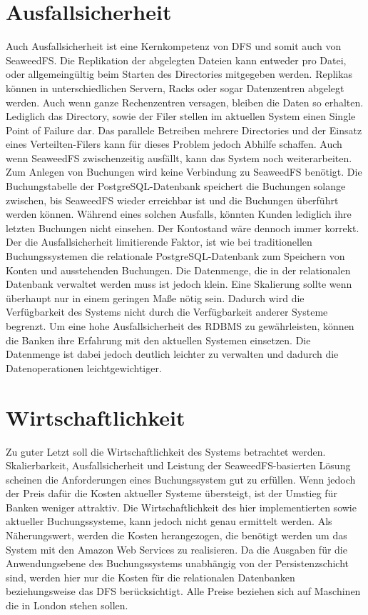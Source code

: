 \documentclass[12pt,oneside,a4paper,parskip]{scrbook}
\begin{document}
\section{Ausfallsicherheit}
Auch Ausfallsicherheit ist eine Kernkompetenz von DFS und somit auch von SeaweedFS. Die Replikation der abgelegten Dateien kann entweder pro Datei, oder allgemeingültig beim Starten des Directories mitgegeben werden. Replikas können in unterschiedlichen Servern, Racks oder sogar Datenzentren abgelegt werden. Auch wenn ganze Rechenzentren versagen, bleiben die Daten so erhalten. Lediglich das Directory, sowie der Filer stellen im aktuellen System einen Single Point of Failure dar. Das parallele Betreiben mehrere Directories und der Einsatz eines Verteilten-Filers kann für dieses Problem jedoch Abhilfe schaffen. Auch wenn SeaweedFS zwischenzeitig ausfällt, kann das System noch weiterarbeiten. Zum Anlegen von Buchungen wird keine Verbindung zu SeaweedFS benötigt. Die Buchungstabelle der PostgreSQL-Datenbank speichert die Buchungen solange zwischen, bis SeaweedFS wieder erreichbar ist und die Buchungen überführt werden können. Während eines solchen Ausfalls, könnten Kunden lediglich ihre letzten Buchungen nicht einsehen. Der Kontostand wäre dennoch immer korrekt. Der die Ausfallsicherheit limitierende Faktor, ist wie bei traditionellen Buchungssystemen die relationale PostgreSQL-Datenbank zum Speichern von Konten und ausstehenden Buchungen. Die Datenmenge, die in der relationalen Datenbank verwaltet werden muss ist jedoch klein. Eine Skalierung sollte wenn überhaupt nur in einem geringen Maße nötig sein. Dadurch wird die Verfügbarkeit des Systems nicht durch die Verfügbarkeit anderer Systeme begrenzt. Um eine hohe Ausfallsicherheit des RDBMS zu gewährleisten, können die Banken ihre Erfahrung mit den aktuellen Systemen einsetzen. Die Datenmenge ist dabei jedoch deutlich leichter zu verwalten und dadurch die Datenoperationen leichtgewichtiger.


\section{Wirtschaftlichkeit}
Zu guter Letzt soll die Wirtschaftlichkeit des Systems betrachtet werden. Skalierbarkeit, Ausfallsicherheit und Leistung der SeaweedFS-basierten Lösung scheinen die Anforderungen eines Buchungssystem gut zu erfüllen. Wenn jedoch der Preis dafür die Kosten aktueller Systeme übersteigt, ist der Umstieg für Banken weniger attraktiv. Die Wirtschaftlichkeit des hier implementierten sowie aktueller Buchungssysteme, kann jedoch nicht genau ermittelt werden. Als Näherungswert, werden die Kosten herangezogen, die benötigt werden um das System mit den Amazon Web Services zu realisieren. Da die Ausgaben für die Anwendungsebene des Buchungssystems unabhängig von der Persistenzschicht sind, werden hier nur die Kosten für die relationalen Datenbanken beziehungsweise das DFS berücksichtigt. Alle Preise beziehen sich auf Maschinen die in London stehen sollen.
\end{document}

